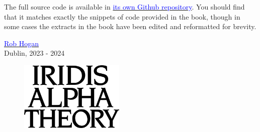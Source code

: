 The full source code is available in
\href{https://github.com/mwenge/iridisalpha}{\textcolor{blue}{its own Github
repository}}.  You should find that it matches exactly the snippets of code
provided in the book, though in some cases the extracts in the book have been
edited and reformatted for brevity.

\href{https://mastodon.social/@mwenge}{\textcolor{blue}{Rob Hogan}}\\
Dublin, 2023 - 2024 \\

\vspace*{\fill}
\begin{figure}[H]
    \centering
      \includegraphics[width=5cm]{src/cover/title_page.png}%
\end{figure}
\vspace*{\fill}
\thispagestyle{empty}%
\clearpage

